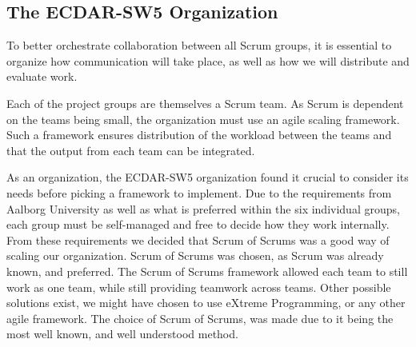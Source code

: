 \subsection{The ECDAR-SW5 Organization}\label{sub:ecdar-organization}
To better orchestrate collaboration between all Scrum groups, it is essential to organize how communication will take place, as well as how we will distribute and evaluate work.

Each of the project groups are themselves a Scrum team.
As Scrum is dependent on the teams being small, the organization must use an agile scaling framework.
Such a framework ensures distribution of the workload between the teams and that the output from each team can be integrated. 


As an organization, the ECDAR-SW5 organization found it crucial to consider its needs before picking a framework to implement.
Due to the requirements from Aalborg University as well as what is preferred within the six individual groups, each group must be self-managed and free to decide how they work internally.
From these requirements we decided that Scrum of Scrums was a good way of scaling our organization. Scrum of Scrums was chosen, as Scrum was already known, and preferred. The Scrum of Scrums framework allowed each team to still work as one team, while still providing teamwork across teams. Other possible solutions exist, we might have chosen to use eXtreme Programming, or any other agile framework. The choice of Scrum of Scrums, was made due to it being the most well known, and well understood method.

